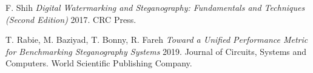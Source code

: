 \documentclass[11pt]{article}
\begin{document}

  \begin{thebibliography}{1}

   F. Shih {\em Digital Watermarking and Steganography: Fundamentals and Techniques
(Second Edition)} 2017. CRC Press.					
  
   T. Rabie, M. Baziyad, T. Bonny, R. Fareh {\em Toward a Unified Performance Metric for Benchmarking
Steganography Systems} 2019. Journal of Circuits, Systems and Computers. World Scientific Publishing Company.

% 
% 

  \end{thebibliography}
\end{document}
